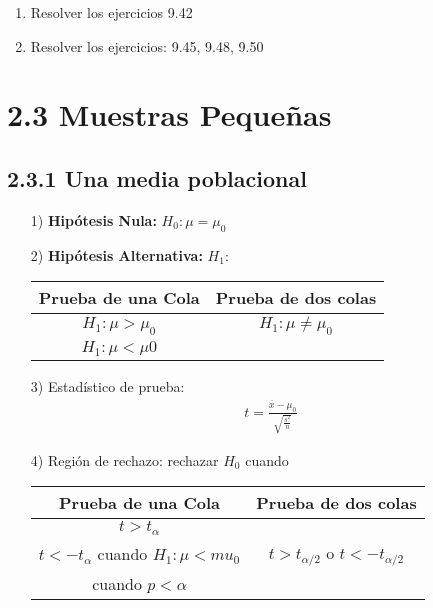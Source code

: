 \begin{frame}
\begin{frame}
\begin{Ejem}
\end{Ejem}
\begin{enumerate}
\item Resolver los ejercicios 9.42

\item Resolver los ejercicios: 9.45, 9.48, 9.50
\end{enumerate}







\section{2.3 Muestras Peque\~nas}

\subsection{2.3.1 Una media poblacional}




\begin{itemize}
\item[1) ] \textbf{Hip\'otesis Nula:} $H_{0}:\mu=\mu_{0}$
\item[2) ] \textbf{Hip\'otesis Alternativa: } $H_{1}:$
\begin{tabular}{cc}\hline
\textbf{Prueba de una Cola} & \textbf{Prueba de dos colas}\\\hline
$H_{1}:\mu>\mu_{0}$ & $H_{1}:\mu\neq \mu_{0}$\\ 
$H_{1}:\mu<\mu0$&\\
\end{tabular}
\item[3) ] Estad\'istico de prueba:
\begin{eqnarray*}
t=\frac{\overline{x}-\mu_{0}}{\sqrt{\frac{s^{2}}{n}}}
\end{eqnarray*}
\item[4) ] Regi\'on de rechazo: rechazar $H_{0}$ cuando
\begin{tabular}{cc}\hline
\textbf{Prueba de una Cola} & \textbf{Prueba de dos colas}\\\hline
$t>t_{\alpha}$ & \\
$t<-t_{\alpha}$ cuando $H_{1}:\mu<mu_{0}$&$t>t_{\alpha/2}$ o $t<-t_{\alpha/2}$\\
 cuando $p<\alpha$&\\
\end{tabular}
\end{itemize}







\end{frame}
\end{frame}
